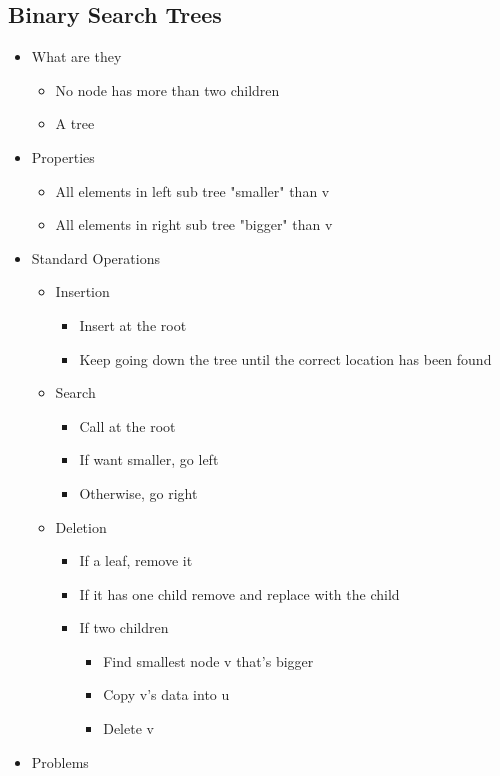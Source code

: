 \documentclass{article}[18pt]
\begin{document}
\begin{itemize}
\section{Binary Search Trees}
\begin{itemize}
	\item What are they
	\begin{itemize}
		\item No node has more than two children
		\item A tree
	\end{itemize}
	\item Properties
	\begin{itemize}
		\item All elements in left sub tree "smaller" than v
		\item All elements in right sub tree "bigger" than v
	\end{itemize}
	\item Standard Operations
	\begin{itemize}
		\item Insertion
		\begin{itemize}
			\item Insert at the root
			\item Keep going down the tree until the correct location has been found
		\end{itemize}
		\item Search
		\begin{itemize}
			\item Call at the root
			\item If want smaller, go left
			\item Otherwise, go right
		\end{itemize}
		\item Deletion
		\begin{itemize}
			\item If a leaf, remove it
			\item If it has one child remove and replace with the child
			\item If two children
			\begin{itemize}
				\item Find smallest node v that's bigger
				\item Copy v's data into u
				\item Delete v
			\end{itemize}
		\end{itemize}
	\end{itemize}
	\item Problems
\end{itemize}
\end{itemize}
\end{document}
